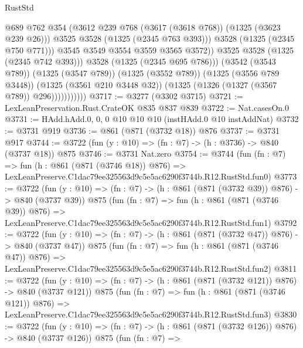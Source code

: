 \begin{lexlean}{RustStd}
\begin{coremodule}
                                  @689
                                  @762
                                  @354
                                  (@3612 @239 @768 (@3617 (@3618 @768)) (@1325 (@3623 @239 @26)))
                                  @3525
                                  @3528
                                  (@1325 (@2345 @763 @393)))
                                @3528
                                (@1325 (@2345 @750 @771)))
                              @3545
                              @3549
                              @3554
                              @3559
                              @3565
                              @3572))
                          @3525
                          @3528
                          (@1325 (@2345 @742 @393)))
                        @3528
                        (@1325 (@2345 @695 @786)))
                      (@3542 (@3543 @789))
                      (@1325 (@3547 @789))
                      (@1325 (@3552 @789))
                      (@1325 (@3556 @789 @3448))
                      (@1325 (@3561 @210 @3448 @32))
                      (@1325 (@1326 (@1327 (@3567 @789)) @296)))))))))))
@3717 := @3277 (@3302 @3715)
@3721 := LexLeanPreservation.Rust.CrateOK @835 @837 @839
@3722 := Nat.casesOn.{0}
@3731 := HAdd.hAdd.{0, 0, 0} @10 @10 @10 (instHAdd.{0} @10 instAddNat)
@3732 := @3731 @919
@3736 := @861 (@871 (@3732 @18)) @876
@3737 := @3731 @917
@3744 := @3722 (fun (y : @10) => (fn : @7) -> (h : @3736) -> @840 (@3737 @18)) @875
@3746 := @3731 Nat.zero
@3754 := @3744
    (fun (fn : @7) =>
    fun (h : @861 (@871 (@3746 @18)) @876) =>
    LexLeanPreserve.C1dac79ee325563d9c5e5ac6290f3744b.R12.RustStd.fun0)
@3773 := @3722
    (fun (y : @10) => (fn : @7) -> (h : @861 (@871 (@3732 @39)) @876) -> @840 (@3737 @39))
    @875
    (fun (fn : @7) =>
    fun (h : @861 (@871 (@3746 @39)) @876) =>
    LexLeanPreserve.C1dac79ee325563d9c5e5ac6290f3744b.R12.RustStd.fun1)
@3792 := @3722
    (fun (y : @10) => (fn : @7) -> (h : @861 (@871 (@3732 @47)) @876) -> @840 (@3737 @47))
    @875
    (fun (fn : @7) =>
    fun (h : @861 (@871 (@3746 @47)) @876) =>
    LexLeanPreserve.C1dac79ee325563d9c5e5ac6290f3744b.R12.RustStd.fun2)
@3811 := @3722
    (fun (y : @10) => (fn : @7) -> (h : @861 (@871 (@3732 @121)) @876) -> @840 (@3737 @121))
    @875
    (fun (fn : @7) =>
    fun (h : @861 (@871 (@3746 @121)) @876) =>
    LexLeanPreserve.C1dac79ee325563d9c5e5ac6290f3744b.R12.RustStd.fun3)
@3830 := @3722
    (fun (y : @10) => (fn : @7) -> (h : @861 (@871 (@3732 @126)) @876) -> @840 (@3737 @126))
    @875
    (fun (fn : @7) =>

\end{coremodule}
\end{lexlean}
